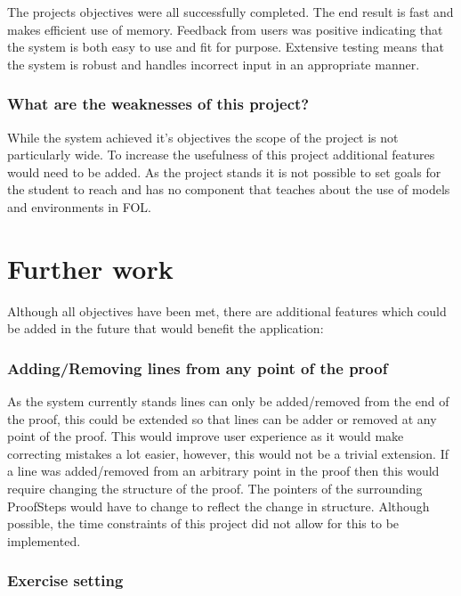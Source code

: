\noindent The projects objectives were all successfully completed. The end result is fast and makes efficient use of memory. Feedback from users was positive indicating that the system is both easy to use and fit for purpose. Extensive testing means that the system is robust and handles incorrect input in an appropriate manner.

\subsubsection*{What are the weaknesses of this project?}

\noindent While the system achieved it's objectives the scope of the project is not particularly wide. To increase the usefulness of this project additional features would need to be added. As the project stands it is not possible to set goals for the student to reach and has no component that teaches about the use of models and environments in FOL.


\section{Further work}

Although all objectives have been met, there are additional features which could be added in the future that would benefit the application:

\subsubsection*{Adding/Removing lines from any point of the proof}

As the system currently stands lines can only be added/removed from the end of the proof, this could be extended so that lines can be adder or removed at any point of the proof. This would improve user experience as it would make correcting mistakes a lot easier, however, this would not be a trivial extension. If a line was added/removed from an arbitrary point in the proof then this would require changing the structure of the proof. The pointers of the surrounding ProofSteps would have to change to reflect the change in structure. Although possible, the time constraints of this project did not allow for this to be implemented.

\subsubsection*{Exercise setting}

